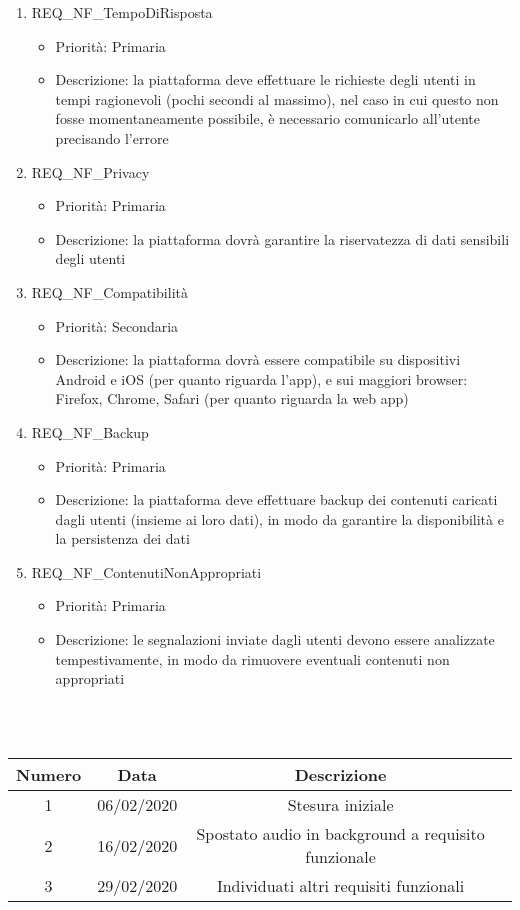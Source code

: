 \begin{enumerate}	
	\item REQ\_NF\_TempoDiRisposta
		\begin{itemize}
		\item Priorità: Primaria
		\item Descrizione: la piattaforma deve effettuare le richieste degli utenti in tempi ragionevoli (pochi secondi al massimo), nel caso in cui questo non fosse momentaneamente possibile, è necessario comunicarlo all'utente precisando l'errore
		\end{itemize}

	\item REQ\_NF\_Privacy
		\begin{itemize}
		\item Priorità: Primaria
		\item Descrizione: la piattaforma dovrà garantire la riservatezza di dati sensibili degli utenti
		\end{itemize}

	\item REQ\_NF\_Compatibilità
		\begin{itemize}
		\item Priorità: Secondaria
		\item Descrizione: la piattaforma dovrà essere compatibile su dispositivi Android e iOS (per quanto riguarda l'app), e sui maggiori browser: Firefox, Chrome, Safari (per quanto riguarda la web app)
		\end{itemize}
	
	\item REQ\_NF\_Backup
		\begin{itemize}
		\item Priorità: Primaria
		\item Descrizione: la piattaforma deve effettuare backup dei contenuti caricati dagli utenti (insieme ai loro dati), in modo da garantire la disponibilità e la persistenza dei dati
		\end{itemize}

	\item REQ\_NF\_ContenutiNonAppropriati
		\begin{itemize}
		\item Priorità: Primaria
		\item Descrizione: le segnalazioni inviate dagli utenti devono essere analizzate tempestivamente, in modo da rimuovere eventuali contenuti non appropriati
		\end{itemize}

\end{enumerate}

 \\ \\
\begin{tabular}{|c | c | c | c|} 
 	\hline
	 Numero & Data & Descrizione \\ [0.5ex] 
	\hline\hline
	1 & 06/02/2020 & Stesura iniziale \\ 
	\hline
	2 & 16/02/2020 & Spostato audio in background a requisito funzionale \\
	\hline
	3 & 29/02/2020 & Individuati altri requisiti funzionali \\ 
	\hline
\end{tabular}
